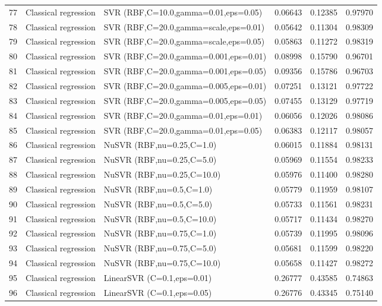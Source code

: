 \documentclass[10pt]{article}
\begin{document}
\begin{longtable}{C{0.75cm}L{2.35cm}L{8.0cm}C{1.15cm}C{1.15cm}C{1.15cm}}
77 & Classical regression & SVR (RBF,C=10.0,gamma=0.01,eps=0.05) & 0.06643 & 0.12385 & 0.97970 \\
78 & Classical regression & SVR (RBF,C=20.0,gamma=scale,eps=0.01) & 0.05642 & 0.11304 & 0.98309 \\
79 & Classical regression & SVR (RBF,C=20.0,gamma=scale,eps=0.05) & 0.05863 & 0.11272 & 0.98319 \\
80 & Classical regression & SVR (RBF,C=20.0,gamma=0.001,eps=0.01) & 0.08998 & 0.15790 & 0.96701 \\
81 & Classical regression & SVR (RBF,C=20.0,gamma=0.001,eps=0.05) & 0.09356 & 0.15786 & 0.96703 \\
82 & Classical regression & SVR (RBF,C=20.0,gamma=0.005,eps=0.01) & 0.07251 & 0.13121 & 0.97722 \\
83 & Classical regression & SVR (RBF,C=20.0,gamma=0.005,eps=0.05) & 0.07455 & 0.13129 & 0.97719 \\
84 & Classical regression & SVR (RBF,C=20.0,gamma=0.01,eps=0.01) & 0.06056 & 0.12026 & 0.98086 \\
85 & Classical regression & SVR (RBF,C=20.0,gamma=0.01,eps=0.05) & 0.06383 & 0.12117 & 0.98057 \\
86 & Classical regression & NuSVR (RBF,nu=0.25,C=1.0) & 0.06015 & 0.11884 & 0.98131 \\
87 & Classical regression & NuSVR (RBF,nu=0.25,C=5.0) & 0.05969 & 0.11554 & 0.98233 \\
88 & Classical regression & NuSVR (RBF,nu=0.25,C=10.0) & 0.05976 & 0.11400 & 0.98280 \\
89 & Classical regression & NuSVR (RBF,nu=0.5,C=1.0) & 0.05779 & 0.11959 & 0.98107 \\
90 & Classical regression & NuSVR (RBF,nu=0.5,C=5.0) & 0.05733 & 0.11561 & 0.98231 \\
91 & Classical regression & NuSVR (RBF,nu=0.5,C=10.0) & 0.05717 & 0.11434 & 0.98270 \\
92 & Classical regression & NuSVR (RBF,nu=0.75,C=1.0) & 0.05739 & 0.11995 & 0.98096 \\
93 & Classical regression & NuSVR (RBF,nu=0.75,C=5.0) & 0.05681 & 0.11599 & 0.98220 \\
94 & Classical regression & NuSVR (RBF,nu=0.75,C=10.0) & 0.05658 & 0.11427 & 0.98272 \\
95 & Classical regression & LinearSVR (C=0.1,eps=0.01) & 0.26777 & 0.43585 & 0.74863 \\
96 & Classical regression & LinearSVR (C=0.1,eps=0.05) & 0.26776 & 0.43345 & 0.75140 \\

\end{longtable}
\end{document}
